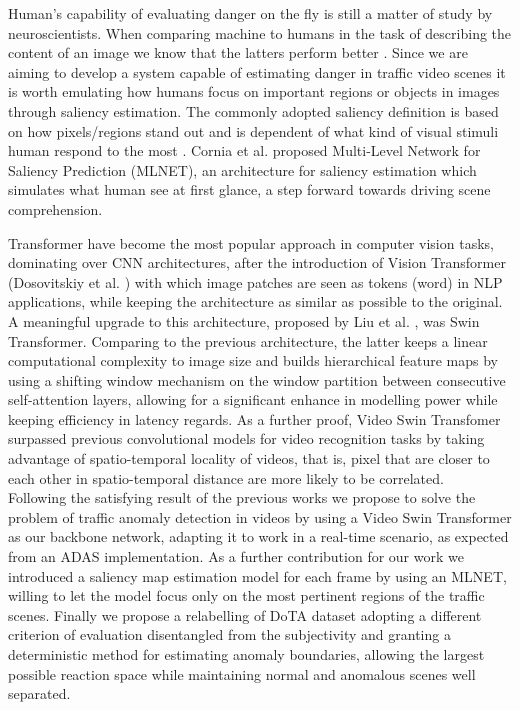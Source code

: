Human's capability of evaluating danger on the fly is still a matter of study by neuroscientists.
When comparing machine to humans in the task of describing the content of an image we know that the latters perform better \cite{jiang2015salicon}.
Since we are aiming to develop a system capable of estimating danger in traffic video scenes it is worth emulating how humans focus on important regions or objects in images through saliency estimation.
The commonly adopted saliency definition is based on how pixels/regions stand out and is dependent of what kind of visual stimuli human respond to the most \cite{yan2013hierachical}.
Cornia et al.\cite{cornia2016saliency} proposed Multi-Level Network for Saliency Prediction (MLNET), an architecture for saliency estimation which simulates what human see at first glance, a step forward towards driving scene comprehension.

Transformer have become the most popular approach in computer vision tasks, dominating over CNN architectures, after the introduction of Vision Transformer (Dosovitskiy et al. \cite{DBLP:conf/iclr/DosovitskiyB0WZ21})  with which image patches are seen as tokens (word) in NLP applications, while keeping the architecture as similar as possible to the original.
A meaningful upgrade to this architecture, proposed by Liu et al. \cite{liu2021Swin}, was Swin Transformer.
Comparing to the previous architecture, the latter keeps a linear computational complexity to image size and builds hierarchical feature maps by using a shifting window mechanism on the window partition between consecutive self-attention layers, allowing for a significant enhance in modelling power while keeping efficiency in latency regards.
As a further proof, Video Swin Transfomer \cite{liu_video_2022} surpassed previous convolutional models for video recognition tasks by taking advantage of spatio-temporal locality of videos, that is, pixel that are closer to each other in spatio-temporal distance are more likely to be correlated.\\

Following the satisfying result of the previous works we propose to solve the problem of traffic anomaly detection in videos by using a Video Swin Transformer as our backbone network, adapting it to work in a real-time scenario, as expected from an ADAS implementation.
As a further contribution for our work we introduced a saliency map estimation model for each frame by using an MLNET, willing to let the model focus only on the most pertinent regions of the traffic scenes.
Finally we propose a relabelling of DoTA dataset adopting a different criterion of evaluation disentangled from the subjectivity and granting a deterministic method for estimating anomaly boundaries, allowing the largest possible reaction space while maintaining normal and anomalous scenes well separated.

